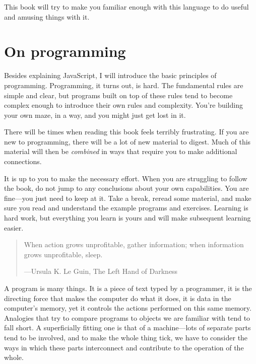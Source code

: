 This book will try to make you familiar enough with this language to do useful and amusing things with it.

\section{On programming}

Besides explaining JavaScript, I will introduce the basic principles of programming. Programming, it turns out, is hard. The fundamental rules are simple and clear, but programs built on top of these rules tend to become complex enough to introduce their own rules and complexity. You're building your own maze, in a way, and you might just get lost in it.

There will be times when reading this book feels terribly frustrating. If you are new to programming, there will be a lot of new material to digest. Much of this material will then be \emph{combined} in ways that require you to make additional connections.

It is up to you to make the necessary effort. When you are struggling to follow the book, do not jump to any conclusions about your own capabilities. You are fine—you just need to keep at it. Take a break, reread some material, and make sure you read and understand the example programs and exercises. Learning is hard work, but everything you learn is yours and will make subsequent learning easier.

\begin{quote}

When action grows unprofitable, gather information; when information grows unprofitable, sleep.

{---Ursula K. Le Guin, The Left Hand of Darkness}
\end{quote}

A program is many things. It is a piece of text typed by a programmer, it is the directing force that makes the computer do what it does, it is data in the computer's memory, yet it controls the actions performed on this same memory. Analogies that try to compare programs to objects we are familiar with tend to fall short. A superficially fitting one is that of a machine—lots of separate parts tend to be involved, and to make the whole thing tick, we have to consider the ways in which these parts interconnect and contribute to the operation of the whole.

